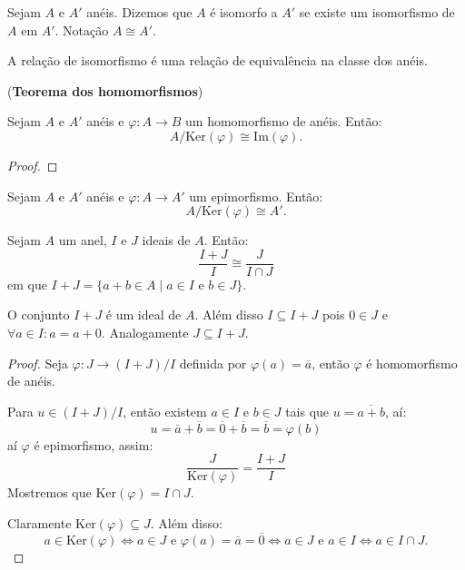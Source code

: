 \documentclass[11pt,twoside,a4paper]{book}
\begin{document}
\begin{definicao}
Sejam $A$ e $A'$ anéis. Dizemos que $A$ é isomorfo a $A'$ se existe um isomorfismo de $A$ em $A'$. Notação $A\cong A'$.
\end{definicao}

\begin{observacao}
A relação de isomorfismo é uma relação de equivalência na classe dos anéis.
\end{observacao}

\begin{teorema}
(\textbf{Teorema dos homomorfismos})

\noindent
Sejam $A$ e $A'$ anéis e $\varphi:A\rightarrow B$ um homomorfismo de anéis. Então:
\[
A/\mathrm{Ker}(\varphi)\cong\mathrm{Im}(\varphi).
\]
\end{teorema}
\begin{proof}

\end{proof}

\begin{observacao}

\end{observacao}

\begin{corolario}
Sejam $A$ e $A'$ anéis e $\varphi:A\rightarrow A'$ um epimorfismo. Então:
\[
A/\mathrm{Ker}(\varphi)\cong A'.
\]
\end{corolario}

\begin{corolario}
Sejam $A$ um anel, $I$ e $J$ ideais de $A$. Então:
\[
\frac{I+J}{I}\cong\frac{J}{I\cap J}
\]
em que $I+J=\{a+b\in A\mid a\in I\text{ e }b\in J\}$.
\end{corolario}

\begin{observacao}
O conjunto $I+J$ é um ideal de $A$. Além disso $I\subseteq I+J$ pois $0\in J$ e $\forall a\in I:a=a+0$. Analogamente $J\subseteq I+J$.
\end{observacao}

\begin{proof}
Seja $\varphi:J\rightarrow(I+J)/I$ definida por $\varphi(a)=\overline{a}$, então $\varphi$ é homomorfismo de anéis.

\medskip
\noindent
Para $u\in(I+J)/I$, então existem $a\in I$ e $b\in J$ tais que $u=\overline{a+b}$, aí:
\[
u=\overline{a}+\overline{b}=\overline{0}+\overline{b}=\overline{b}=\varphi(b)
\]
aí $\varphi$ é epimorfismo, assim:
\[
\frac{J}{\mathrm{Ker}(\varphi)}=\frac{I+J}{I}
\]
Mostremos que $\mathrm{Ker}(\varphi)=I\cap J$.

\medskip
\noindent
Claramente $\mathrm{Ker}(\varphi)\subseteq J$. Além disso:
\[
a\in\mathrm{Ker}(\varphi)\Leftrightarrow a\in J\text{ e }\varphi(a)=\overline{a}=\overline{0}\Leftrightarrow a\in J\text{ e }a\in I\Leftrightarrow a\in I\cap J.
\]
\end{proof}
\end{document}
